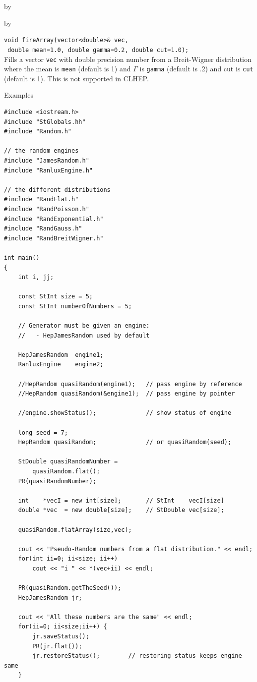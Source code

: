 \documentclass[twoside]{article}
\newcommand{\comp}[1]{\texttt{#1}}%
\newcommand{\entrylabel}[1]{\mbox{\textbf{{#1}}}\hfil}%
\newenvironment{entry}
{\begin{list}{}%
    {\renewcommand{\makelabel}{\entrylabel}%
     \setlength{\labelwidth}{90pt}%
     \setlength{\leftmargin}{\labelwidth}
     \advance\leftmargin by \labelsep%
      }%
    }%
  {\end{list}}
\newcommand{\Entrylabel}[1]%
{\raisebox{0pt}[1ex][0pt]{\makebox[\labelwidth][l]%
    {\parbox[t]{\labelwidth}{\hspace{0pt}\textbf{{#1}}}}}}
\newenvironment{Entry}%
{\renewcommand{\entrylabel}{\Entrylabel}\begin{entry}}%
  {\end{entry}}
\begin{document}
\begin{description}
\begin{Entry}
\begin{Entry}
    \verb+void fireArray(vector<double>& vec,+\\
    \verb+ double mean=1.0, double gamma=0.2, double cut=1.0);+\\
    Fills a vector \comp{vec} with double
    precision number from a Breit-Wigner
    distribution where the mean is \comp{mean} (default is 1)
    and $\Gamma$ is \comp{gamma} (default is .2) and cut is
    \comp{cut} (default is 1).  This is not supported in CLHEP.
    
     
\item[Examples]
{\footnotesize
\begin{verbatim}
#include <iostream.h>
#include "StGlobals.hh"
#include "Random.h"

// the random engines
#include "JamesRandom.h"
#include "RanluxEngine.h"

// the different distributions
#include "RandFlat.h"
#include "RandPoisson.h"
#include "RandExponential.h"
#include "RandGauss.h"
#include "RandBreitWigner.h"

int main()
{
    int i, jj;
    
    const StInt size = 5;
    const StInt numberOfNumbers = 5;
    
    // Generator must be given an engine:
    //   - HepJamesRandom used by default

    HepJamesRandom  engine1;
    RanluxEngine    engine2;
    
    //HepRandom quasiRandom(engine1);   // pass engine by reference
    //HepRandom quasiRandom(&engine1);  // pass engine by pointer

    //engine.showStatus();              // show status of engine
    
    long seed = 7;
    HepRandom quasiRandom;              // or quasiRandom(seed);
    
    StDouble quasiRandomNumber =
        quasiRandom.flat();
    PR(quasiRandomNumber);

    int    *vecI = new int[size];       // StInt    vecI[size]
    double *vec  = new double[size];    // StDouble vec[size];
    
    quasiRandom.flatArray(size,vec);

    cout << "Pseudo-Random numbers from a flat distribution." << endl;
    for(int ii=0; ii<size; ii++)
        cout << "i " << *(vec+ii) << endl;
        
    PR(quasiRandom.getTheSeed());
    HepJamesRandom jr;

    cout << "All these numbers are the same" << endl;
    for(ii=0; ii<size;ii++) {
        jr.saveStatus();
        PR(jr.flat());
        jr.restoreStatus();        // restoring status keeps engine same
    }


\end{verbatim}}
\end{Entry}
\end{Entry}
\end{description}
\end{document}
